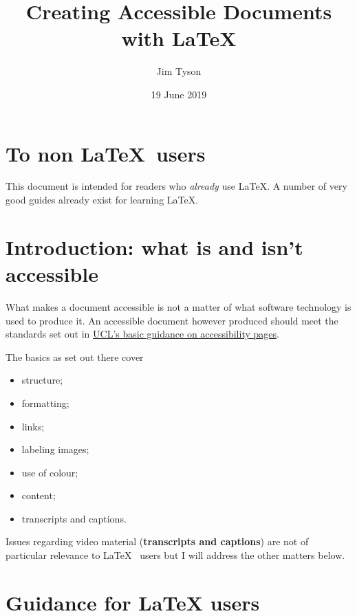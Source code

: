 \documentclass[]{article}
\title{Creating Accessible Documents with LaTeX}
\author{Jim Tyson}
\date{19 June 2019}
\providecommand{\tightlist}{%
  \setlength{\itemsep}{0pt}\setlength{\parskip}{0pt}}
\begin{document}
\onehalfspacing

\maketitle

{
\setcounter{tocdepth}{2}
\tableofcontents
}
\hypertarget{to-non-users}{%
\section{\texorpdfstring{To non
\LaTeX~users}{To non ~users}}\label{to-non-users}}

This document is intended for readers who \emph{already} use \LaTeX. A
number of very good guides already exist for learning \LaTeX.

\hypertarget{introduction-what-is-and-isnt-accessible}{%
\section{Introduction: what is and isn't
accessible}\label{introduction-what-is-and-isnt-accessible}}

What makes a document accessible is not a matter of what software
technology is used to produce it. An accessible document however
produced should meet the standards set out in
\href{https://www.ucl.ac.uk/isd/services/websites-apps/creating-accessible-content/accessibility-fundamentals}{UCL's
basic guidance on accessibility pages}.

The basics as set out there cover

\begin{itemize}
\tightlist
\item
  structure;
\item
  formatting;
\item
  links;
\item
  labeling images;
\item
  use of colour;
\item
  content;%
\item
  transcripts and captions.
\end{itemize}

Issues regarding video material (\textbf{transcripts and captions}) are
not of particular relevance to \LaTeX~ users but I will address the
other matters below.

\hypertarget{guidance-for-latex-users}{%
\section{Guidance for LaTeX users}\label{guidance-for-latex-users}}
\end{document}
